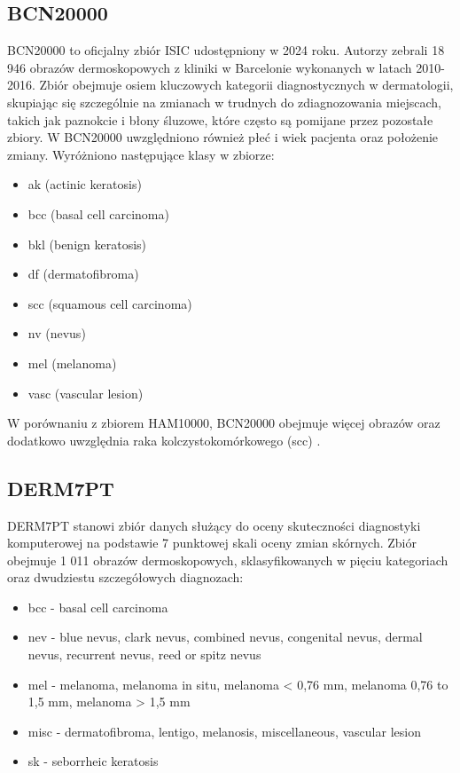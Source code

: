 \subsection{BCN20000}
BCN20000 to oficjalny zbiór ISIC udostępniony w 2024 roku.
Autorzy zebrali 18 946 obrazów dermoskopowych z kliniki w Barcelonie wykonanych w latach 2010-2016.
Zbiór obejmuje osiem kluczowych kategorii diagnostycznych w dermatologii, skupiając się szczególnie na zmianach w trudnych do zdiagnozowania miejscach, takich jak paznokcie i błony śluzowe, które często są pomijane przez pozostałe zbiory.
W BCN20000 uwzględniono również płeć i wiek pacjenta oraz położenie zmiany.
Wyróżniono następujące klasy w zbiorze:
\begin{itemize}
	\item ak (actinic keratosis)
	\item bcc (basal cell carcinoma)
	\item bkl (benign keratosis)
	\item df (dermatofibroma)
	\item scc (squamous cell carcinoma)
	\item nv (nevus)
	\item mel (melanoma)
	\item vasc (vascular lesion)
\end{itemize}

W porównaniu z zbiorem HAM10000, BCN20000 obejmuje więcej obrazów oraz dodatkowo uwzględnia raka kolczystokomórkowego (scc) \cite{Hernández2024}.

\subsection{DERM7PT}
DERM7PT stanowi zbiór danych służący do oceny skuteczności diagnostyki komputerowej na podstawie 7 punktowej skali oceny zmian skórnych.
Zbiór obejmuje 1 011 obrazów dermoskopowych, sklasyfikowanych w pięciu kategoriach oraz dwudziestu szczegółowych diagnozach:
\begin{itemize}
	\item bcc - basal cell carcinoma
	\item nev - blue nevus, clark nevus, combined nevus, congenital nevus, dermal nevus, recurrent nevus, reed or spitz nevus
	\item mel - melanoma, melanoma in situ, melanoma < 0,76 mm, melanoma 0,76 to 1,5 mm, melanoma > 1,5 mm
	\item misc - dermatofibroma, lentigo, melanosis, miscellaneous, vascular lesion
	\item sk - seborrheic keratosis
\end{itemize}

